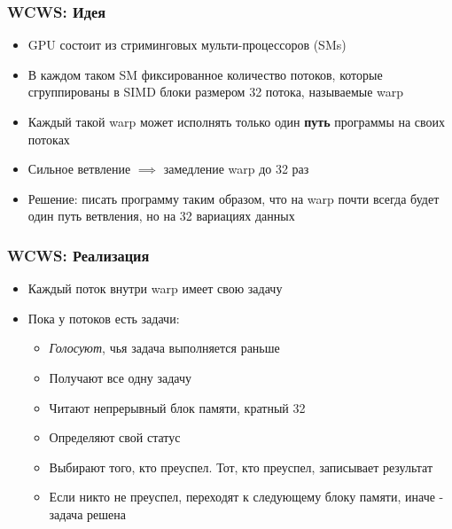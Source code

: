\documentclass[xcolor=table,english]{beamer}
\begin{document}
\begin{frame}[fragile] \frametitle{WCWS: Идея}
    \begin{itemize}
        \item GPU состоит из стриминговых мульти-процессоров (SMs)
        \item В каждом таком SM фиксированное количество потоков, которые сгруппированы в SIMD блоки размером 32 потока, называемые warp 
        \item Каждый такой warp может исполнять только один \textbf{путь} программы на своих потоках
        \item Сильное ветвление $\implies$ замедление warp до 32 раз
        \item Решение: писать программу таким образом, что на warp почти всегда будет один путь ветвления, но на 32 вариациях данных
    \end{itemize}
\end{frame}

\begin{frame}[fragile] \frametitle{WCWS: Реализация}
    \begin{itemize}
        \item Каждый поток внутри warp имеет свою задачу
        \item Пока у потоков есть задачи:
        {
        \begin{itemize}
            \item \textit{Голосуют}, чья задача выполняется раньше
            \item Получают все одну задачу
            \item Читают непрерывный блок памяти, кратный 32
            \item Определяют свой статус
            \item Выбирают того, кто преуспел. Тот, кто преуспел, записывает результат
            \item Если никто не преуспел, переходят к следующему блоку памяти, иначе - задача решена
        \end{itemize}
        }
    \end{itemize}
\end{frame}
\end{document}
